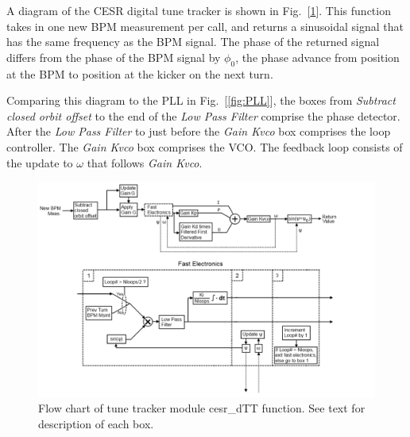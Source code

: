 A diagram of the CESR digital tune tracker is shown in Fig.~[\ref{fig:CdTT}].  This function takes in one new
BPM measurement per call, and returns a sinusoidal signal that has the same frequency as the BPM signal.
The phase of the returned signal differs from the phase of the BPM signal by $\phi_0$, the phase advance
from position at the BPM to position at the kicker on the next turn.

Comparing this diagram to the PLL in Fig.~[\ref{fig:PLL}], the boxes from {\it Subtract closed orbit offset}
to the end of the {\it Low Pass Filter} comprise the phase detector.  After the {\it Low Pass Filter} to
just before the {\it Gain Kvco} box comprises the loop controller.  The {\it Gain Kvco} box comprises the
VCO.  The feedback loop consists of the update to $\omega$ that follows {\it Gain Kvco}.

\begin{figure}
\includegraphics[width=\columnwidth]{TT-Flow.png}
\caption{Flow chart of tune tracker module cesr\_dTT function.  See text for description of each box.}
\label{fig:CdTT}
\end{figure}

\clearpage


